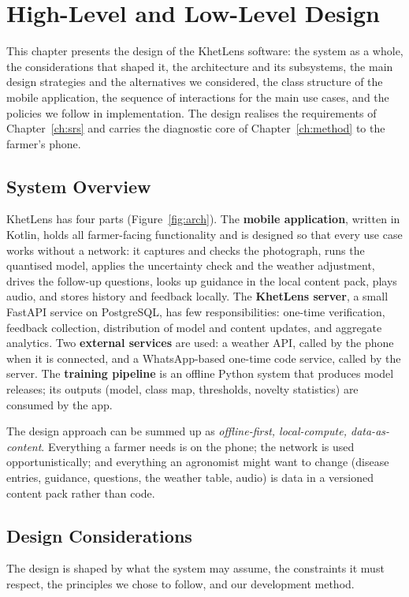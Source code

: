 \chapter{High-Level and Low-Level Design}
\label{ch:design}

This chapter presents the design of the KhetLens software: the system as a whole, the considerations that shaped it, the architecture and its subsystems, the main design strategies and the alternatives we considered, the class structure of the mobile application, the sequence of interactions for the main use cases, and the policies we follow in implementation. The design realises the requirements of Chapter~\ref{ch:srs} and carries the diagnostic core of Chapter~\ref{ch:method} to the farmer's phone.

\section{System Overview}
KhetLens has four parts (Figure~\ref{fig:arch}). The \textbf{mobile application}, written in Kotlin, holds all farmer-facing functionality and is designed so that every use case works without a network: it captures and checks the photograph, runs the quantised model, applies the uncertainty check and the weather adjustment, drives the follow-up questions, looks up guidance in the local content pack, plays audio, and stores history and feedback locally. The \textbf{KhetLens server}, a small FastAPI service on PostgreSQL, has few responsibilities: one-time verification, feedback collection, distribution of model and content updates, and aggregate analytics. Two \textbf{external services} are used: a weather API, called by the phone when it is connected, and a WhatsApp-based one-time code service, called by the server. The \textbf{training pipeline} is an offline Python system that produces model releases; its outputs (model, class map, thresholds, novelty statistics) are consumed by the app.

The design approach can be summed up as \emph{offline-first, local-compute, data-as-content}. Everything a farmer needs is on the phone; the network is used opportunistically; and everything an agronomist might want to change (disease entries, guidance, questions, the weather table, audio) is data in a versioned content pack rather than code.

\section{Design Considerations}
The design is shaped by what the system may assume, the constraints it must respect, the principles we chose to follow, and our development method.

